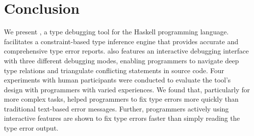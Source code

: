 \section{Conclusion}

We present \chameleon{}, a type debugging tool for the Haskell programming language. \chameleon{} facilitates a constraint-based type inference engine that provides accurate and comprehensive type error reports. \chameleon{} also features an interactive debugging interface with three different debugging modes, enabling programmers to navigate deep type relations and triangulate conflicting statements in source code. Four experiments with human participants were conducted to evaluate the tool's design with programmers with varied experiences. We found that, particularly for more complex tasks, \chameleon{} helped programmers to fix type errors more quickly than traditional text-based error messages.  Further, programmers actively using \chameleon{} interactive features are shown to fix type errors faster than simply reading the type error output.